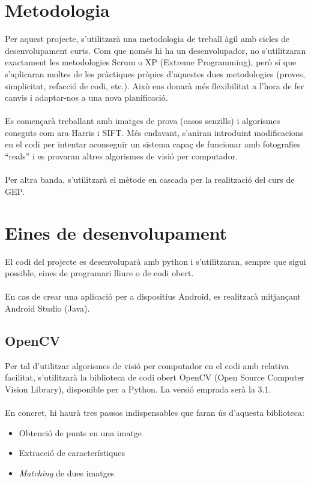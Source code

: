 \section{Metodologia}
	Per aquest projecte, s'utilitzarà una metodologia de treball àgil amb cicles de desenvolupament curts.
	Com que només hi ha un desenvolupador, no s'utilitzaran exactament les metodologies Scrum o XP\cite{Pxp} (Extreme Programming),
	però sí que s'aplicaran moltes de les pràctiques pròpies d'aquestes dues metodologies (proves, simplicitat, refacció de codi, etc.).
	Això ens donarà més flexibilitat a l'hora de fer canvis i adaptar-nos a una nova planificació.\\\\
	Es començarà treballant amb imatges de prova (casos senzills) i algorismes coneguts com ara Harris\cite{Harris} i SIFT. Més endavant, s'aniran introduint modificacions en el codi per intentar aconseguir un
	sistema capaç de funcionar amb fotografies ``reals'' i es provaran altres algorismes de visió per computador.\\\\
	Per altra banda, s'utilitzarà el mètode en cascada per la realització del curs de GEP.
\section{Eines de desenvolupament}
	El codi del projecte es desenvoluparà amb python i s'utilitzaran, sempre que sigui possible, eines de programari lliure o de codi obert.\\\\
	En cas de crear una aplicació per a dispositius Android, es realitzarà mitjançant Android Studio (Java).
	\subsection{OpenCV}
		Per tal d'utilitzar algorismes de visió per computador en el codi amb relativa facilitat, s'utilitzarà la biblioteca de codi obert OpenCV\cite{OpenCV} (Open Source Computer Vision Library),
		disponible per a Python. La versió emprada serà la 3.1.\\\\
		En concret, hi haurà tres passos indispensables que faran ús d'aquesta biblioteca:\\
		\begin{itemize}
			\item {Obtenció de punts en una imatge}
			\item {Extracció de característiques}
			\item \textit{Matching} de dues imatges
		\end{itemize}
